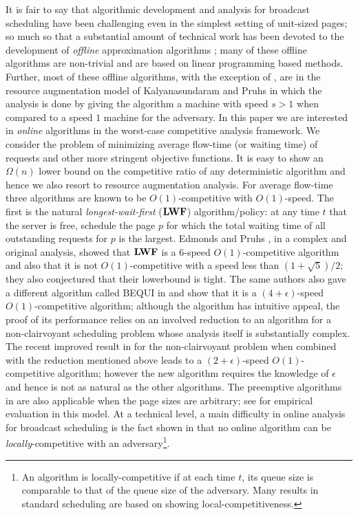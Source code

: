 \documentclass[11pt]{article}
\newcommand{\eps}{\epsilon}
\begin{document}
\begin{titlepage}
It is fair to say that algorithmic development and analysis for
broadcast scheduling have been challenging even in the simplest
setting of unit-sized pages; so much so that a substantial amount of
technical work has been devoted to the development of {\em offline}
approximation algorithms
\cite{KalyanasundaramPV00,ErlebachH02,GandhiKKW04,GandhiKPS06,BansalCKN05,BansalCS06};
many of these offline algorithms are non-trivial and are based on
linear programming based methods. Further, most of these offline
algorithms, with the exception of \cite{BansalCS06}, are in the
resource augmentation model of Kalyanasundaram and Pruhs
\cite{KalyanasundaramP95} in which the analysis is done by giving the
algorithm a machine with speed $s > 1$ when compared to a speed $1$
machine for the adversary.  In this paper we are interested in {\em
  online} algorithms in the worst-case competitive analysis
framework. We consider the problem of minimizing average flow-time (or
waiting time) of requests and other more stringent objective
functions. It is easy to show an $\Omega(n)$ lower bound on the
competitive ratio \cite{KalyanasundaramPV00} of any deterministic
algorithm and hence we also resort to resource augmentation analysis.
For average flow-time three algorithms are known to be
$O(1)$-competitive with $O(1)$-speed.  The first is the natural {\em
  longest-wait-first} (${\texttt{\bf{LWF}}}$) algorithm/policy: at any time $t$ that
the server is free, schedule the page $p$ for which the total waiting
time of all outstanding requests for $p$ is the largest. Edmonds and
Pruhs \cite{EdmondsP04}, in a complex and original analysis, showed
that ${\texttt{\bf{LWF}}}$ is a $6$-speed $O(1)$-competitive algorithm and also that
it is not $O(1)$-competitive with a speed less than
$(1+\sqrt{5})/2$; they also conjectured that their lowerbound is tight. The same authors also gave a different algorithm
called BEQUI in \cite{EdmondsP03} and show that it is a
$(4+\eps)$-speed $O(1)$-competitive algorithm; although the algorithm
has intuitive appeal, the proof of its
performance relies on an involved reduction to an algorithm for a
non-clairvoyant scheduling problem \cite{Edmonds00} whose analysis
itself is substantially complex. The recent improved result in
\cite{EdmondsP09} for the non-clairvoyant problem when combined with
the reduction mentioned above leads to a $(2+\eps)$-speed
$O(1)$-competitive algorithm; however the new algorithm requires the
knowledge of $\epsilon$ and hence is not as natural as the other
algorithms. The preemptive algorithms in \cite{EdmondsP03,EdmondsP09} are also
applicable when the page sizes are arbitrary; see
\cite{Hall03} for empirical evaluation in this model.
At a technical level, a main difficulty in online analysis for broadcast
scheduling is the fact shown in \cite{KalyanasundaramPV00} that no
online algorithm can be {\em locally}-competitive with an adversary\footnote{An algorithm is locally-competitive if at each time $t$, its queue size
is comparable to that of the queue size of the adversary. Many results in
standard scheduling are based on showing local-competitiveness.}.


\end{titlepage}
\end{document}
